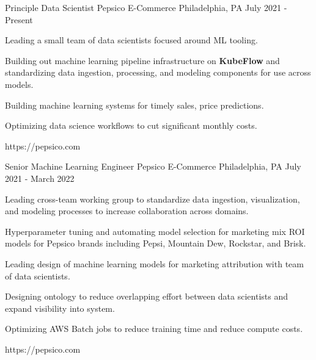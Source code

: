 
\begin{cventries}

	\cventrylink
	{Principle Data Scientist}
	{Pepsico E-Commerce}
	{Philadelphia, PA}
	{July 2021 - Present}
	{
		\begin{cvitems}
			\item{Leading a small team of data scientists focused around ML tooling.}
			\item{Building out machine learning pipeline infrastructure on \textbf{KubeFlow} and standardizing data ingestion, processing, and modeling components for use across models.}
			\item{Building machine learning systems for timely sales, price predictions.}
			\item{Optimizing data science workflows to cut significant monthly costs.}
		\end{cvitems}
	}
	{https://pepsico.com}



	\cventrylink
	{Senior Machine Learning Engineer}
	{Pepsico E-Commerce}
	{Philadelphia, PA}
	{July 2021 - March 2022}
	{
		\begin{cvitems}
			\item{Leading cross-team working group to standardize data ingestion, visualization, and modeling processes to increase collaboration across domains.}
			\item{Hyperparameter tuning and automating model selection for marketing mix ROI models for Pepsico brands including Pepsi, Mountain Dew, Rockstar, and Brisk.}
			\item{Leading design of machine learning models for marketing attribution with team of data scientists.}
			\item{Designing ontology to reduce overlapping effort between data scientists and expand visibility into system.}
			\item{Optimizing AWS Batch jobs to reduce training time and reduce compute costs.}
		\end{cvitems}
	}
	{https://pepsico.com}




\end{cventries}
